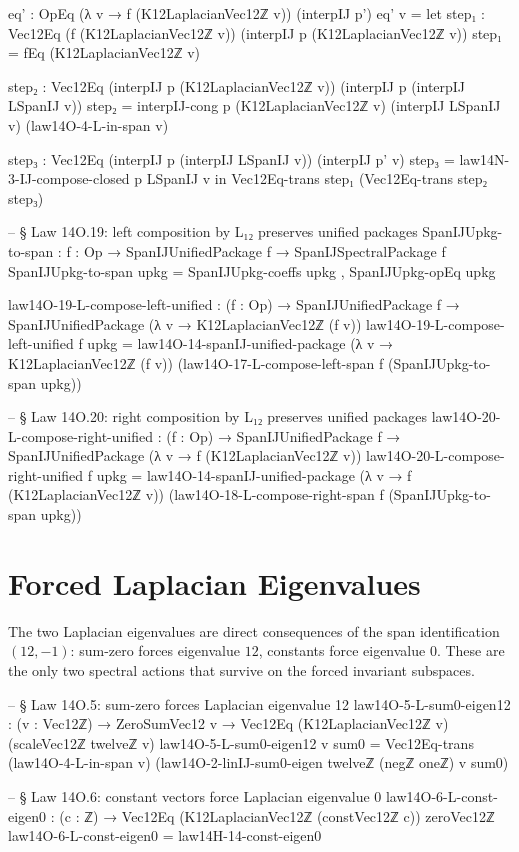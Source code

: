 \documentclass[11pt,a4paper]{book}
\begin{document}
\begin{code}
    eq' : OpEq (λ v → f (K12LaplacianVec12ℤ v)) (interpIJ p')
    eq' v =
      let
        step₁ : Vec12Eq (f (K12LaplacianVec12ℤ v)) (interpIJ p (K12LaplacianVec12ℤ v))
        step₁ = fEq (K12LaplacianVec12ℤ v)

        step₂ : Vec12Eq (interpIJ p (K12LaplacianVec12ℤ v)) (interpIJ p (interpIJ LSpanIJ v))
        step₂ = interpIJ-cong p (K12LaplacianVec12ℤ v) (interpIJ LSpanIJ v) (law14O-4-L-in-span v)

        step₃ : Vec12Eq (interpIJ p (interpIJ LSpanIJ v)) (interpIJ p' v)
        step₃ = law14N-3-IJ-compose-closed p LSpanIJ v
      in
      Vec12Eq-trans step₁ (Vec12Eq-trans step₂ step₃)

-- § Law 14O.19: left composition by L₁₂ preserves unified packages
SpanIJUpkg-to-span : {f : Op} → SpanIJUnifiedPackage f → SpanIJSpectralPackage f
SpanIJUpkg-to-span upkg = SpanIJUpkg-coeffs upkg , SpanIJUpkg-opEq upkg

law14O-19-L-compose-left-unified : (f : Op) → SpanIJUnifiedPackage f → SpanIJUnifiedPackage (λ v → K12LaplacianVec12ℤ (f v))
law14O-19-L-compose-left-unified f upkg =
  law14O-14-spanIJ-unified-package
    (λ v → K12LaplacianVec12ℤ (f v))
    (law14O-17-L-compose-left-span f (SpanIJUpkg-to-span upkg))

-- § Law 14O.20: right composition by L₁₂ preserves unified packages
law14O-20-L-compose-right-unified : (f : Op) → SpanIJUnifiedPackage f → SpanIJUnifiedPackage (λ v → f (K12LaplacianVec12ℤ v))
law14O-20-L-compose-right-unified f upkg =
  law14O-14-spanIJ-unified-package
    (λ v → f (K12LaplacianVec12ℤ v))
    (law14O-18-L-compose-right-span f (SpanIJUpkg-to-span upkg))
\end{code}


\section{Forced Laplacian Eigenvalues}

The two Laplacian eigenvalues are direct consequences of the
span identification $(12,-1)$: sum-zero forces eigenvalue $12$,
constants force eigenvalue $0$.  These are the only two spectral actions that
survive on the forced invariant subspaces.

\begin{code}
-- § Law 14O.5: sum-zero forces Laplacian eigenvalue 12
law14O-5-L-sum0-eigen12 : (v : Vec12ℤ) → ZeroSumVec12 v → Vec12Eq (K12LaplacianVec12ℤ v) (scaleVec12ℤ twelveℤ v)
law14O-5-L-sum0-eigen12 v sum0 =
  Vec12Eq-trans
    (law14O-4-L-in-span v)
    (law14O-2-linIJ-sum0-eigen twelveℤ (negℤ oneℤ) v sum0)

-- § Law 14O.6: constant vectors force Laplacian eigenvalue 0
law14O-6-L-const-eigen0 : (c : ℤ) → Vec12Eq (K12LaplacianVec12ℤ (constVec12ℤ c)) zeroVec12ℤ
law14O-6-L-const-eigen0 = law14H-14-const-eigen0
\end{code}
\end{document}
